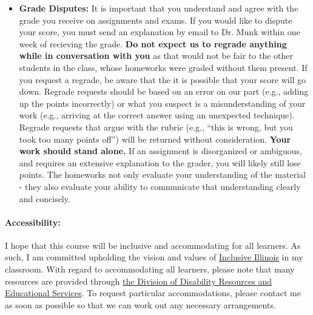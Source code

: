 \documentclass[11pt, a4paper]{article}
\begin{document}
\begin{itemize}
\item[] \textbf{Grade Disputes:} It is important that you understand and agree
        with the grade you receive on assignments and exams. If you would like
        to dispute your score, you must send an explanation by email to Dr.
        Munk within one week of recieving the grade.
        \textbf{Do not expect us to regrade anything while in conversation with
        you} as that would not be fair to the other students in the class, whose
        homeworks were graded without them present.  If you request a regrade,
        be aware that the it is possible that your score will go down.
        Regrade requests should be based on an error on our part (e.g., adding
        up the points incorrectly) or what you suspect is a misunderstanding of
        your work (e.g., arriving at the correct answer using an unexpected
        technique). Regrade requests that argue with the rubric (e.g., ``this is
        wrong, but you took too many points off'') will be returned without
        consideration.
        \textbf{Your work should stand alone.} If an assignment is disorganized or
        ambiguous, and requires an extensive explanation to the grader, you
        will likely still lose points. The homeworks not only evaluate your
        understanding of the material - they also evaluate your ability to
        communicate that understanding clearly and concisely.
\end{itemize}

\paragraph{Accessibility:} I hope that this course will be inclusive and
accommodating for all learners. As such, I am committed upholding the vision
and values of \href{http://www.inclusiveillinois.illinois.edu/index.html}{Inclusive Illinois}
in my
classroom.  With regard to accommodating all learners, please note that many
resources are provided through
\href{http://disability.illinois.edu/academic-support/accommodations}{the
Division of Disability Resources and Educational Services}.  To request
particular accommodations, please contact me as soon as possible so that we can
work out any necessary arrangements.
\end{document}
